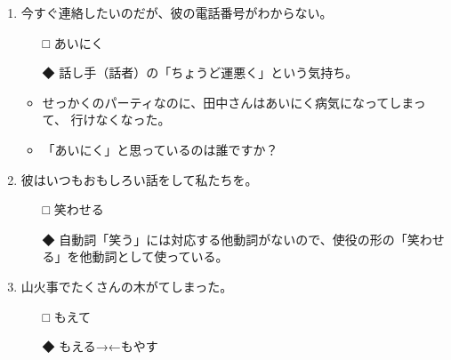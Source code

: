 \documentclass[
uplatex,
b5paper,
10pt,
dvipdfmx
]{jsbook}
\begin{document}
\begin{enumerate}
\item 今すぐ連絡したいのだが、\underline{\hspace{3zw}}彼の電話番号がわからない。
\begin{itemize}
\item[□] あいにく 
\item[◆] 話し手（話者）の「ちょうど運悪く」という気持ち。
\end{itemize}
\begin{itemize}
\item せっかくのパーティなのに、田中さんはあいにく病気になってしまって、
      行けなくなった。
\item 「あいにく」と思っているのは誰ですか？
\end{itemize}

\item 彼はいつもおもしろい話をして私たちを\underline{\hspace{3zw}}。
\begin{itemize}
\item[□] 笑わせる
\item[◆] 自動詞「笑う」には対応する他動詞がないので、使役の形の「笑わせ
	  る」を他動詞として使っている。
\end{itemize}

   
\item 山火事でたくさんの木が\underline{\hspace{3zw}}てしまった。
\begin{itemize}
\item[□] もえて
\item[◆] もえる→←もやす
\end{itemize}
\end{enumerate}


\end{document}
